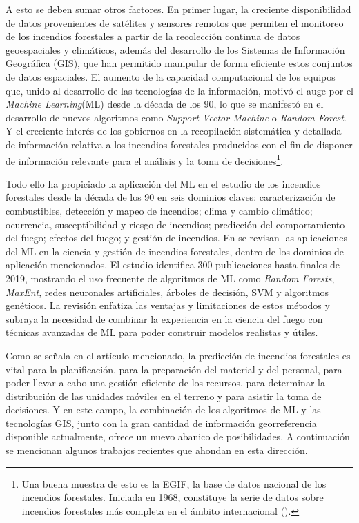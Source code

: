 \documentclass[12pt,a4paper,]{book}
\let\rmarkdownfootnote\footnote%
\def\footnote{\protect\rmarkdownfootnote}
\numberwithin{dummy}{section}
\theoremstyle{ocrenumbox}
\theoremstyle{blacknumex}
\theoremstyle{blacknumbox}
\theoremstyle{ocrenum}
\theoremstyle{ocrenum}
\begin{document}
A esto se deben sumar otros factores. En primer lugar, la creciente
disponibilidad de datos provenientes de satélites y sensores remotos que
permiten el monitoreo de los incendios forestales a partir de la
recolección continua de datos geoespaciales y climáticos, además del
desarrollo de los Sistemas de Información Geográfica (GIS), que han
permitido manipular de forma eficiente estos conjuntos de datos
espaciales. El aumento de la capacidad computacional de los equipos que,
unido al desarrollo de las tecnologías de la información, motivó el auge
por el \emph{Machine Learning}(ML) desde la década de los 90, lo que se
manifestó en el desarrollo de nuevos algoritmos como \emph{Support
Vector Machine} o \emph{Random Forest}. Y el creciente interés de los
gobiernos en la recopilación sistemática y detallada de información
relativa a los incendios forestales producidos con el fin de disponer de
información relevante para el análisis y la toma de
decisiones\footnote{Una buena muestra de esto es la EGIF, la base de
  datos nacional de los incendios forestales. Iniciada en 1968,
  constituye la serie de datos sobre incendios forestales más completa
  en el ámbito internacional (\citet{miteco}).}.

Todo ello ha propiciado la aplicación del ML en el estudio de los
incendios forestales desde la década de los 90 en seis dominios claves:
caracterización de combustibles, detección y mapeo de incendios; clima y
cambio climático; ocurrencia, susceptibilidad y riesgo de incendios;
predicción del comportamiento del fuego; efectos del fuego; y gestión de
incendios. En \citet{ReviewMLApplicationsWF} se revisan las aplicaciones
del ML en la ciencia y gestión de incendios forestales, dentro de los
dominios de aplicación mencionados. El estudio identifica 300
publicaciones hasta finales de 2019, mostrando el uso frecuente de
algoritmos de ML como \emph{Random Forests}, \emph{MaxEnt}, redes
neuronales artificiales, árboles de decisión, SVM y algoritmos
genéticos. La revisión enfatiza las ventajas y limitaciones de estos
métodos y subraya la necesidad de combinar la experiencia en la ciencia
del fuego con técnicas avanzadas de ML para poder construir modelos
realistas y útiles.

Como se señala en el artículo mencionado, la predicción de incendios
forestales es vital para la planificación, para la preparación del
material y del personal, para poder llevar a cabo una gestión eficiente
de los recursos, para determinar la distribución de las unidades móviles
en el terreno y para asistir la toma de decisiones. Y en este campo, la
combinación de los algoritmos de ML y las tecnologías GIS, junto con la
gran cantidad de información georreferencia disponible actualmente,
ofrece un nuevo abanico de posibilidades. A continuación se mencionan
algunos trabajos recientes que ahondan en esta dirección.
\end{document}
